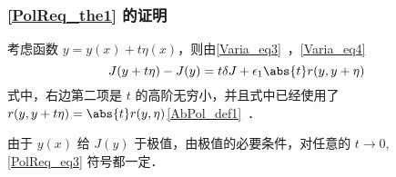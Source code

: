  \subsubsection{\autoref{PolReq_the1} 的证明}
考虑函数 $y=y(x)+t\eta(x)$，则由\autoref{Varia_eq3}~，\autoref{Varia_eq4}~
\begin{equation}\label{PolReq_eq3}
J(y+t\eta)-J(y)=t\delta J+\epsilon_1\abs{t}r(y,y+\eta)
\end{equation}
式中，右边第二项是 $t$ 的高阶无穷小，并且式中已经使用了 $r(y,y+t\eta)=\abs{t}r(y,\eta)$\autoref{AbPol_def1}~．

由于 $y(x)$ 给 $J(y)$ 于极值，由极值的必要条件，对任意的 $t\rightarrow0$, \autoref{PolReq_eq3} 符号都一定．
